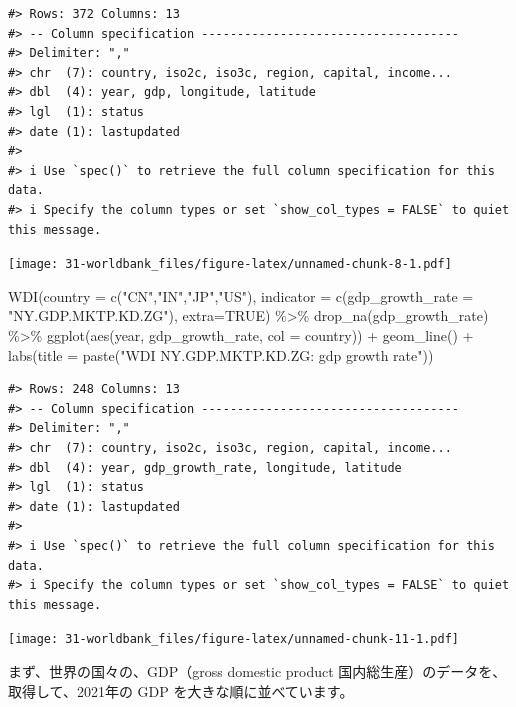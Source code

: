\documentclass[
]{bxjsbook}
\newenvironment{Shaded}{\begin{snugshade}}{\end{snugshade}}
\newcommand{\AttributeTok}[1]{\textcolor[rgb]{0.77,0.63,0.00}{#1}}
\newcommand{\ConstantTok}[1]{\textcolor[rgb]{0.00,0.00,0.00}{#1}}
\newcommand{\FunctionTok}[1]{\textcolor[rgb]{0.00,0.00,0.00}{#1}}
\newcommand{\NormalTok}[1]{#1}
\newcommand{\SpecialCharTok}[1]{\textcolor[rgb]{0.00,0.00,0.00}{#1}}
\newcommand{\StringTok}[1]{\textcolor[rgb]{0.31,0.60,0.02}{#1}}
\theoremstyle{definition}
\theoremstyle{definition}
\theoremstyle{definition}
\theoremstyle{definition}
\theoremstyle{remark}
\begin{document}
\begin{verbatim}
#> Rows: 372 Columns: 13
#> -- Column specification ------------------------------------
#> Delimiter: ","
#> chr  (7): country, iso2c, iso3c, region, capital, income...
#> dbl  (4): year, gdp, longitude, latitude
#> lgl  (1): status
#> date (1): lastupdated
#> 
#> i Use `spec()` to retrieve the full column specification for this data.
#> i Specify the column types or set `show_col_types = FALSE` to quiet this message.
\end{verbatim}

\texttt{[image: 31-worldbank\_files/figure-latex/unnamed-chunk-8-1.pdf]}

\begin{Shaded}
\begin{Highlighting}[]
\FunctionTok{WDI}\NormalTok{(}\AttributeTok{country =} \FunctionTok{c}\NormalTok{(}\StringTok{"CN"}\NormalTok{,}\StringTok{"IN"}\NormalTok{,}\StringTok{"JP"}\NormalTok{,}\StringTok{"US"}\NormalTok{), }
    \AttributeTok{indicator =} \FunctionTok{c}\NormalTok{(}\AttributeTok{gdp\_growth\_rate =} \StringTok{"NY.GDP.MKTP.KD.ZG"}\NormalTok{), }\AttributeTok{extra=}\ConstantTok{TRUE}\NormalTok{) }\SpecialCharTok{\%\textgreater{}\%}
  \FunctionTok{drop\_na}\NormalTok{(gdp\_growth\_rate) }\SpecialCharTok{\%\textgreater{}\%} 
  \FunctionTok{ggplot}\NormalTok{(}\FunctionTok{aes}\NormalTok{(year, gdp\_growth\_rate, }\AttributeTok{col =}\NormalTok{ country)) }\SpecialCharTok{+} \FunctionTok{geom\_line}\NormalTok{() }\SpecialCharTok{+}
  \FunctionTok{labs}\NormalTok{(}\AttributeTok{title =} \FunctionTok{paste}\NormalTok{(}\StringTok{"WDI NY.GDP.MKTP.KD.ZG: gdp growth rate"}\NormalTok{))}
\end{Highlighting}
\end{Shaded}

\begin{verbatim}
#> Rows: 248 Columns: 13
#> -- Column specification ------------------------------------
#> Delimiter: ","
#> chr  (7): country, iso2c, iso3c, region, capital, income...
#> dbl  (4): year, gdp_growth_rate, longitude, latitude
#> lgl  (1): status
#> date (1): lastupdated
#> 
#> i Use `spec()` to retrieve the full column specification for this data.
#> i Specify the column types or set `show_col_types = FALSE` to quiet this message.
\end{verbatim}

\texttt{[image: 31-worldbank\_files/figure-latex/unnamed-chunk-11-1.pdf]}

まず、世界の国々の、GDP（gross domestic product 国内総生産）のデータを、取得して、2021年の GDP を大きな順に並べています。
\end{document}
